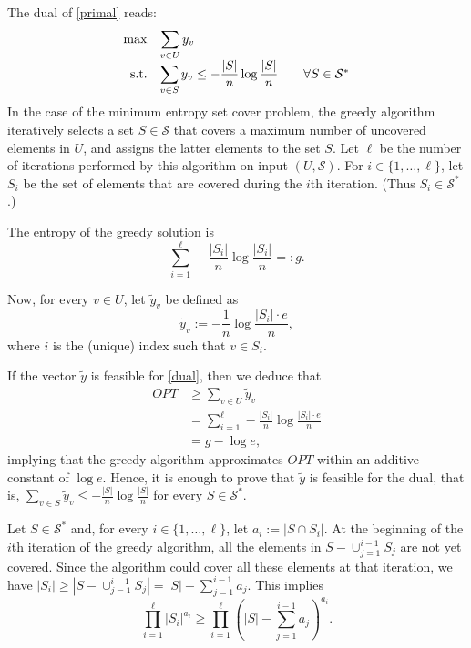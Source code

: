 \documentclass[10pt,a4paper]{article}
\newcommand{\ds}{\displaystyle}
\begin{document}
The dual of \eqref{primal} reads:
\begin{equation}
\label{dual}
\begin{array}{rl@{\qquad}l}
\max          &\ds \sum_{v \in U} y_{v} \\[2ex]
\textrm{s.t.} &\ds \sum_{v \in S} y_{v} \leq -\frac{|S|}{n}\log \frac{|S|}{n} 
& \forall S \in \mathcal{S}^{*}
\end{array}
\end{equation}
In the case of the minimum entropy set cover problem,
the greedy algorithm iteratively selects a set $S\in \mathcal{S}$
that covers a maximum number of uncovered elements in $U$, and assigns the latter
elements to the set $S$. Let $\ell$ be the number of iterations performed by this algorithm 
on input $(U, \mathcal{S})$. For
$i\in \{1, \dots, \ell\}$, let $S_{i}$ be the set of elements that are
covered during the $i$th iteration. (Thus $S_{i} \in \mathcal{S}^{*}$.)

The entropy of the greedy solution is
\begin{equation}
\label{eq:greedy}
\sum_{i=1}^{\ell} -\frac{|S_{i}|}{n}\log \frac{|S_{i}|}{n} =: g.
\end{equation}


Now, for every $v\in U$, let $\tilde y_{v}$ be defined as
$$
\tilde y_{v} := - \frac{1}{n} \log \frac{|S_{i}| \cdot e}{n},
$$
where $i$ is the (unique) index such that $v \in S_{i}$.

If the vector $\tilde y$ is feasible for \eqref{dual}, then we deduce that
\begin{align*}
OPT &\geq \sum_{v \in U} \tilde y_{v}  \\
& = \sum_{i=1}^{\ell} -\frac{|S_{i}|}{n}\log \frac{|S_{i}| \cdot e}{n} \\
& = g - \log e,
\end{align*}
implying that the greedy algorithm approximates $OPT$ within an additive constant of $\log e$.
Hence, it is enough to prove that $\tilde y$ is feasible for the dual, that is, $\sum_{v \in S} \tilde y_{v} \leq -\frac{|S|}{n}\log \frac{|S|}{n}$ for every $S \in \mathcal{S}^{*}$.

Let $S \in \mathcal{S}^{*}$ and, for every  
$i\in \{1, \dots, \ell\}$, let $a_{i}:= |S \cap S_{i}|$. 
At the beginning of the $i$th iteration of the greedy algorithm, all the elements in 
$S - \cup_{j=1}^{i-1}S_{j}$ are not yet covered. 
Since the algorithm could cover all these elements at that iteration, we have
$|S_{i}| \geq |S - \cup_{j=1}^{i-1}S_{j}| = |S| - \sum_{j=1}^{i-1}a_{j}$. This implies
\begin{equation}
\label{eq:S}
\prod_{i=1}^{\ell} |S_{i}|^{a_{i}} \geq 
\prod_{i=1}^{\ell}\left(|S| - \sum_{j=1}^{i-1}a_{j}\right)^{a_{i}}.
\end{equation}
\end{document}
